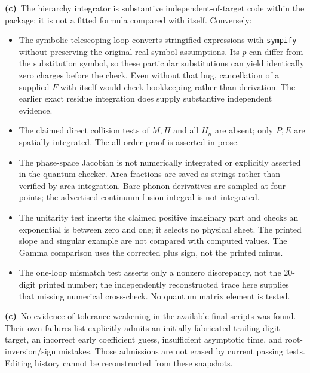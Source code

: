 \documentclass[11pt,a4paper]{article}
\newcommand{\Lc}{\textbf{(c)}\ }
\begin{document}
\Lc The hierarchy integrator is substantive independent-of-target code within
the package; it is not a fitted formula compared with itself. Conversely:
\begin{itemize}
\item The symbolic telescoping loop converts stringified expressions with
\texttt{sympify} without preserving the original real-symbol assumptions.
Its $p$ can differ from the substitution symbol, so these particular
substitutions can yield identically zero charges before the check.
Even without that bug, cancellation of a supplied $F$ with itself would
check bookkeeping rather than derivation. The earlier exact residue
integration does supply substantive independent evidence.
\item The claimed direct collision tests of $M,\Pi$ and all $H_n$ are absent;
only $P,E$ are spatially integrated. The all-order proof is asserted in prose.
\item The phase-space Jacobian is not numerically integrated or explicitly
asserted in the quantum checker. Area fractions are saved as strings rather
than verified by area integration. Bare phonon derivatives are sampled at
four points; the advertised continuum fusion integral is not integrated.
\item The unitarity test inserts the claimed positive imaginary part and
checks an exponential is between zero and one; it selects no physical sheet.
The printed slope and singular example are not compared with computed values.
The Gamma comparison uses the corrected plus sign, not the printed minus.
\item The one-loop mismatch test asserts only a nonzero discrepancy, not the
20-digit printed number; the independently reconstructed trace here supplies
that missing numerical cross-check. No quantum matrix element is tested.
\end{itemize}
\Lc No evidence of tolerance weakening in the available final scripts was
found. Their own failures list explicitly admits an initially fabricated
trailing-digit target, an incorrect early coefficient guess, insufficient
asymptotic time, and root-inversion/sign mistakes. Those admissions are not
erased by current passing tests. Editing history cannot be reconstructed
from these snapshots.
\end{document}
